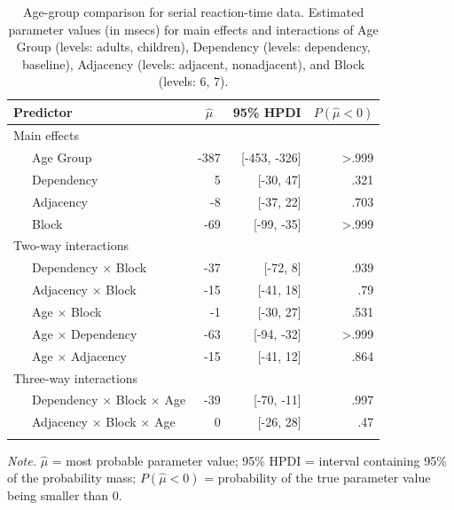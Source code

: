 \documentclass[
  english,
  man,floatsintext]{apa7}
\begin{document}
\begin{table}[ht]

\begin{center}
\begin{threeparttable}

\caption{\label{tab:tablemodel}Age-group comparison for serial reaction-time data. Estimated parameter values (in msecs) for main effects and interactions of Age Group (levels: adults, children), Dependency (levels: dependency, baseline), Adjacency (levels: adjacent, nonadjacent), and Block (levels: 6, 7).}

\small{

\begin{tabular}{lrrr}
\toprule
Predictor & \multicolumn{1}{c}{$\hat{\mu}$} & \multicolumn{1}{c}{95\% HPDI} & \multicolumn{1}{c}{$P(\hat{\mu}<0)$}\\
\midrule
Main effects &  &  & \\
\ \ \ Age Group & -387 & [-453, -326] & >.999\\
\ \ \ Dependency & 5 & [-30, 47] & .321\\
\ \ \ Adjacency & -8 & [-37, 22] & .703\\
\ \ \ Block & -69 & [-99, -35] & >.999\\
Two-way interactions &  &  & \\
\ \ \ Dependency $\times$ Block & -37 & [-72, 8] & .939\\
\ \ \ Adjacency $\times$ Block & -15 & [-41, 18] & .79\\
\ \ \ Age $\times$ Block & -1 & [-30, 27] & .531\\
\ \ \ Age $\times$ Dependency & -63 & [-94, -32] & >.999\\
\ \ \ Age $\times$ Adjacency & -15 & [-41, 12] & .864\\
Three-way interactions &  &  & \\
\ \ \ Dependency $\times$ Block $\times$ Age & -39 & [-70, -11] & .997\\
\ \ \ Adjacency $\times$ Block $\times$ Age & 0 & [-26, 28] & .47\\
\bottomrule
\addlinespace
\end{tabular}

}

\begin{tablenotes}[para]
\normalsize{\textit{Note.} $\hat{\mu}$ = most probable parameter value; 95\% HPDI = interval containing 95\% of the probability mass; $P(\hat{\mu}<0)$ = probability of the true parameter value being smaller than 0.}
\end{tablenotes}

\end{threeparttable}
\end{center}

\end{table}
\end{document}
